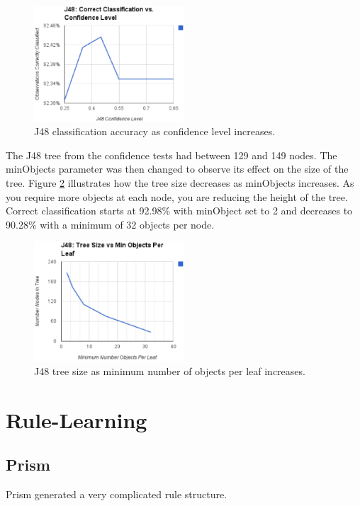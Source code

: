 \documentclass[11pt]{article}
\begin{document}
\begin{figure}[here]
	\centering	
	\includegraphics[width=0.5\textwidth]{eps/j48_confidence}
	\caption{J48 classification accuracy as confidence level increases.}
	\label{fig:j48_confidence}
\end{figure}

The J48 tree from the confidence tests had between 129 and 149 nodes. The minObjects parameter was then changed to observe its effect on the size of the tree. Figure \ref{fig:j48_min_objects} illustrates how the tree size decreases as minObjects increases. As you require more objects at each node, you are reducing the height of the tree. Correct classification starts at 92.98\% with minObject set to 2 and decreases to 90.28\% with a minimum of 32 objects per node.

\begin{figure}[here]
	\centering	
	\includegraphics[width=0.5\textwidth]{eps/j48_min_objects}
	\caption{J48 tree size as minimum number of objects per leaf increases.}
	\label{fig:j48_min_objects}
\end{figure}

\section{Rule-Learning}
\subsection{Prism}
Prism generated a very complicated rule structure.
\end{document}
